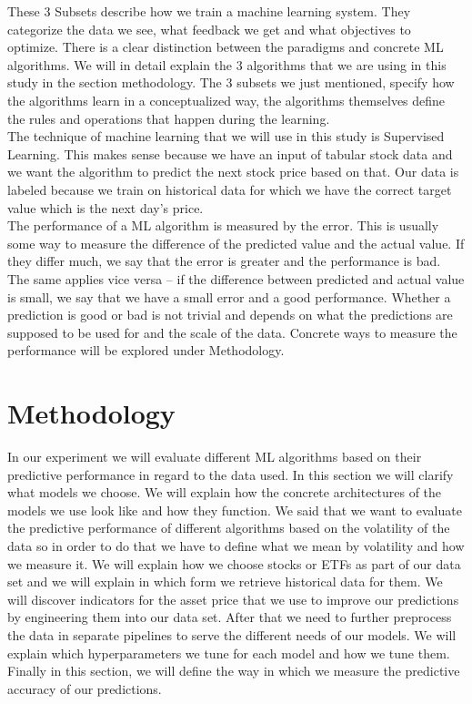 \documentclass[a4paper,12pt]{report}
\begin{document}
	
These 3 Subsets describe how we train a machine learning system. They categorize the data we see, what feedback we get and what objectives to optimize. There is a clear distinction between the paradigms and concrete ML algorithms. We will in detail explain the 3 algorithms that we are using in this study in the section methodology. The 3 subsets we just mentioned, specify how the algorithms learn in a conceptualized way, the algorithms themselves define the rules and operations that happen during the learning.\\
The technique of machine learning that we will use in this study is Supervised Learning. This makes sense because we have an input of tabular stock data and we want the algorithm to predict the next stock price based on that. Our data is labeled because we train on historical data for which we have the correct target value which is the next day's price.\\
The performance of a ML algorithm is measured by the error. This is usually some way to measure the difference of the predicted value and the actual value. If they differ much, we say that the error is greater and the performance is bad. The same applies vice versa – if the difference between predicted and actual value is small, we say that we have a small error and a good performance. Whether a prediction is good or bad is not trivial and depends on what the predictions are supposed to be used for and the scale of the data. Concrete ways to measure the performance will be explored under Methodology.
	
	
	
\chapter{Methodology}
In our experiment we will evaluate different ML algorithms based on their predictive performance in regard to the data used. In this section we will clarify what models we choose. We will explain how the concrete architectures of the models we use look like and how they function. We said that we want to evaluate the predictive performance of different algorithms based on the volatility of the data so in order to do that we have to define what we mean by volatility and how we measure it. We will explain how we choose stocks or ETFs as part of our data set and we will explain in which form we retrieve historical data for them. We will discover indicators for the asset price that we use to improve our predictions by engineering them into our data set. After that we need to further preprocess the data in separate pipelines to serve the different needs of our models. We will explain which hyperparameters we tune for each model and how we tune them. Finally in this section, we will define the way in which we measure the predictive accuracy of our predictions.
\end{document}

